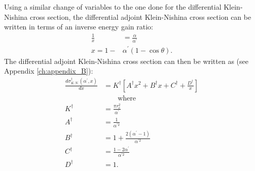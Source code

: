 Using a similar change of variables to the one done for the differential 
Klein-Nishina cross section, the differential adjoint Klein-Nishina cross 
section can be written in terms of an inverse energy gain ratio:
\begin{align}
  \frac{1}{x} & = \frac{\alpha}{\alpha^{'}} \\
  x = 1 - &\alpha^{'}(1-\cos{\theta}).
\end{align}
The differential adjoint Klein-Nishina cross section can then be written as 
(see Appendix \ref{ch:appendix_B}):
\begin{align}
  \frac{d\sigma_{K.N.}^{\dagger}(\alpha^{'},x)}{dx} & = 
  K^{\dagger}\left[A^{\dagger}x^2 + B^{\dagger}x
    + C^{\dagger} + \frac{D^{\dagger}}{x} \right] \\
  &\qquad \text{where} \nonumber \\
  K^{\dagger} & = \frac{\pi r_e^2}{\alpha^{'}} \nonumber \\
  A^{\dagger} & = \frac{1}{\alpha^{'2}} \nonumber \\
  B^{\dagger} & = 1 + \frac{2(\alpha^{'}-1)}{\alpha^{'2}} \nonumber \\
  C^{\dagger} & = \frac{1-2\alpha^{'}}{\alpha^{'2}} \nonumber \\
  D^{\dagger} & = 1. \nonumber 
\end{align}


